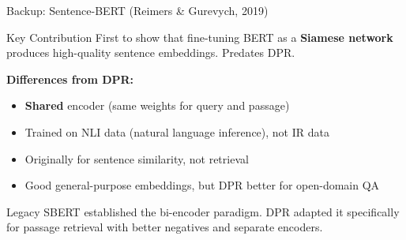 \documentclass[aspectratio=169]{beamer}
\begin{document}
\appendix

\begin{frame}{Backup: Sentence-BERT (Reimers \& Gurevych, 2019)}
\begin{block}{Key Contribution}
First to show that fine-tuning BERT as a \textbf{Siamese network} produces high-quality sentence embeddings. Predates DPR.
\end{block}

\vspace{0.5em}

\textbf{Differences from DPR:}
\begin{itemize}
    \item \textbf{Shared} encoder (same weights for query and passage)
    \item Trained on NLI data (natural language inference), not IR data
    \item Originally for sentence similarity, not retrieval
    \item Good general-purpose embeddings, but DPR better for open-domain QA
\end{itemize}

\vspace{0.5em}

\begin{exampleblock}{Legacy}
SBERT established the bi-encoder paradigm. DPR adapted it specifically for passage retrieval with better negatives and separate encoders.
\end{exampleblock}
\end{frame}
\end{document}
